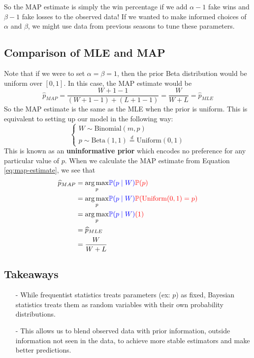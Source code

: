 \documentclass[twoside]{article}
\theoremstyle{definition}
\begin{document}
So the MAP estimate is simply the win percentage if we add $\alpha - 1$ fake wins and $\beta - 1$ fake losses to the observed data! If we wanted to make informed choices of $\alpha$ and $\beta$, we might use data from previous seasons to tune these parameters.

\subsection{Comparison of MLE and MAP}

Note that if we were to set $\alpha = \beta = 1$, then the prior Beta distribution would be uniform over $[0, 1]$. In this case, the MAP estimate would be
\begin{equation}
    \widehat{p}_{MAP} = \frac{W + 1 - 1}{(W + 1 - 1) + (L + 1 - 1)} = \frac{W}{W + L} = \widehat{p}_{MLE}
\end{equation}
So the MAP estimate is the same as the MLE when the prior is uniform. This is equivalent to setting up our model in the following way:
\begin{equation*}
    \begin{cases}
        W \sim \text{Binomial}(m, p) \\
        p \sim \text{Beta}(1, 1) \stackrel{d}{=} \text{Uniform}(0, 1)
    \end{cases}
\end{equation*}
This is known as an \textbf{uninformative prior} which encodes no preference for any particular value of $p$. When we calculate the MAP estimate from Equation \ref{eq:map-estimate}, we see that
\begin{align}
    \widehat{p}_{MAP} &= \underset{p}{\arg\max} \color{blue}\mathbb{P}(p \mid W)\color{black}\color{red}\mathbb{P}(p)\color{black} \nonumber \\
    &= \underset{p}{\arg\max} \color{blue}\mathbb{P}(p \mid W)\color{black}\color{red}\mathbb{P}(\text{Uniform}(0, 1) = p)\color{black} \nonumber \\
    &= \underset{p}{\arg\max} \color{blue}\mathbb{P}(p \mid W)\color{black}\color{red}(1)\color{black} \nonumber \\
    &= \widehat{p}_{MLE} \nonumber \\
    &= \frac{W}{W + L} \nonumber
\end{align}

\subsection{Takeaways}

\begin{itemize}
    \item[-] While frequentist statistics treats parameters (ex: $p$) as fixed, Bayesian statistics treats them as random variables with their own probability distributions.
    \item[-] This allows us to blend observed data with prior information, outside information not seen in the data, to achieve more stable estimators and make better predictions.
\end{itemize}
\end{document}
